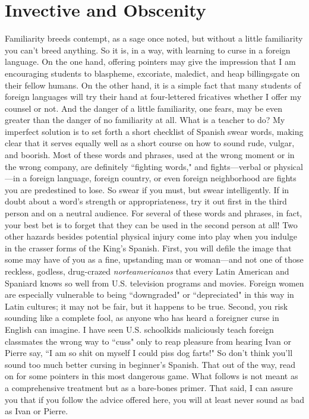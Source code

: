 \chapter{Invective and Obscenity}

Familiarity breeds contempt, as a sage once noted, but without
a little familiarity you can't breed anything. So it is, in a way, with
learning to curse in a foreign language. On the one hand, offering pointers may give the impression that I am encouraging students to blaspheme, excoriate, maledict, and heap billingsgate on their fellow humans. On the other hand, it is a simple fact that many students of
foreign languages will try their hand at four-lettered fricatives whether
I offer my counsel or not. And the danger of a little familiarity, one
fears, may be even greater than the danger of no familiarity at all. What
is a teacher to do?
My imperfect solution is to set forth a short checklist of Spanish swear words, making clear that it serves equally well as a short
course on how to sound rude, vulgar, and boorish. Most of these words
and phrases, used at the wrong moment or in the wrong company, are
definitely ``fighting words," and fights---verbal or physical---in a foreign language, foreign country, or even foreign neighborhood are fights
you are predestined to lose. So swear if you must, but swear intelligently. If in doubt about a word's strength or appropriateness, try it out
first in the third person and on a neutral audience. For several of these
words and phrases, in fact, your best bet is to forget that they can be
used in the second person at all!
Two other hazards besides potential physical injury come into
play when you indulge in the crasser forms of the King's Spanish. First,
you will defile the image that some may have of you as a fine, upstanding man or woman---and not one of those reckless, godless, drug-crazed
\emph{norteamericanos} that every Latin American and Spaniard knows so
well from U.S. television programs and movies. Foreign women are especially vulnerable to being ``downgraded" or ``depreciated" in this
way in Latin cultures; it may not be fair, but it happens to be true.
Second, you risk sounding like a complete fool, as anyone who
has heard a foreigner curse in English can imagine. I have seen U.S.
schoolkids maliciously teach foreign classmates the wrong way to
``cuss" only to reap pleasure from hearing Ivan or Pierre say, ``I am so
shit on myself I could piss dog farts!" So don't think you'll sound too
much better cursing in beginner's Spanish. That out of the way, read
on for some pointers in this most dangerous game. What follows is not
meant as a comprehensive treatment but as a bare-bones primer. That
said, I can assure you that if you follow the advice offered here, you
will at least never sound as bad as Ivan or Pierre.

